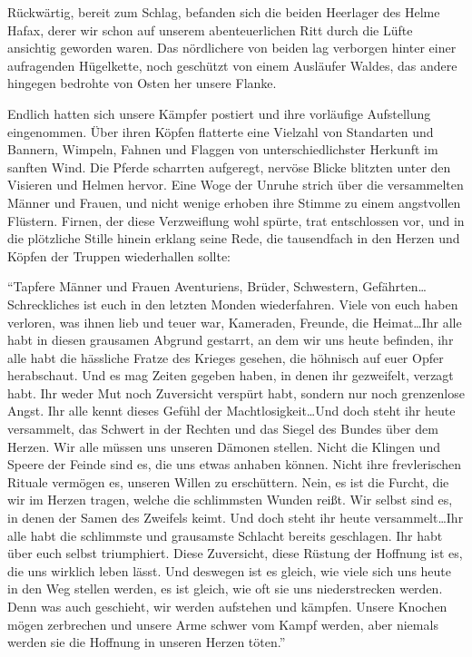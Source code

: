Rückwärtig, bereit zum Schlag, befanden sich die beiden Heerlager des Helme Hafax, derer wir schon auf unserem abenteuerlichen Ritt durch die Lüfte ansichtig geworden waren. Das nördlichere von beiden lag verborgen hinter einer aufragenden Hügelkette, noch geschützt von einem Ausläufer Waldes, das andere hingegen bedrohte von Osten her unsere Flanke.

Endlich hatten sich unsere Kämpfer postiert und ihre vorläufige Aufstellung eingenommen. Über ihren Köpfen flatterte eine Vielzahl von Standarten und Bannern, Wimpeln, Fahnen und Flaggen von unterschiedlichster Herkunft im sanften Wind. Die Pferde scharrten aufgeregt, nervöse Blicke blitzten unter den Visieren und Helmen hervor. Eine Woge der Unruhe strich über die versammelten Männer und Frauen, und nicht wenige erhoben ihre Stimme zu einem angstvollen Flüstern. Firnen, der diese Verzweiflung wohl spürte, trat entschlossen vor, und in die plötzliche Stille hinein erklang seine Rede, die tausendfach in den Herzen und Köpfen der Truppen wiederhallen sollte:

``Tapfere Männer und Frauen Aventuriens, Brüder, Schwestern, Gefährten\dots Schreckliches ist euch in den letzten Monden wiederfahren. Viele von euch haben verloren, was ihnen lieb und teuer war, Kameraden, Freunde, die Heimat\dots Ihr alle habt in diesen grausamen Abgrund gestarrt, an dem wir uns heute befinden, ihr alle habt die hässliche Fratze des Krieges gesehen, die höhnisch auf euer Opfer herabschaut. Und es mag Zeiten gegeben haben, in denen ihr gezweifelt, verzagt habt. Ihr weder Mut noch Zuversicht verspürt habt, sondern nur noch grenzenlose Angst. Ihr alle kennt dieses Gefühl der Machtlosigkeit\dots Und doch steht ihr heute versammelt, das Schwert in der Rechten und das Siegel des Bundes über dem Herzen. Wir alle müssen uns unseren Dämonen stellen. Nicht die Klingen und Speere der Feinde sind es, die uns etwas anhaben können. Nicht ihre frevlerischen Rituale vermögen es, unseren Willen zu erschüttern. Nein, es ist die Furcht, die wir im Herzen tragen, welche die schlimmsten Wunden reißt. Wir selbst sind es, in denen der Samen des Zweifels keimt. Und doch steht ihr heute versammelt\dots Ihr alle habt die schlimmste und grausamste Schlacht bereits geschlagen. Ihr habt über euch selbst triumphiert. Diese Zuversicht, diese Rüstung der Hoffnung ist es, die uns wirklich leben lässt. Und deswegen ist es gleich, wie viele sich uns heute in den Weg stellen werden, es ist gleich, wie oft sie uns niederstrecken werden. Denn was auch geschieht, wir werden aufstehen und kämpfen. Unsere Knochen mögen zerbrechen und unsere Arme schwer vom Kampf werden, aber niemals werden sie die Hoffnung in unseren Herzen töten.''

